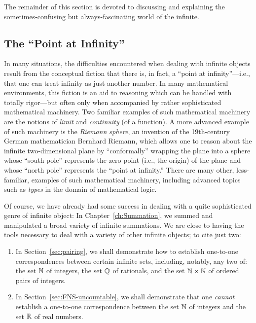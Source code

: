 \medskip

The remainder of this section is devoted to discussing and explaining the sometimes-confusing but always-fascinating world of the infinite.

\subsection{The ``Point at Infinity''}
\label{sec:point-at-infinity}

   
In many situations, the difficulties encountered when dealing with infinite objects result from the conceptual fiction that there is, in fact, a ``point at infinity''---i.e., that one can treat infinity as just
another number.  In many mathematical environments, this fiction is an aid to reasoning which can be handled with totally rigor---but often only when accompanied by rather sophisticated mathematical machinery.  Two familiar examples of such mathematical machinery are the notions
of  {\it limit} and {\it continuity} (of a function).  A more advanced example of such machinery is the {\it Riemann sphere}, an invention of the 19th-century German mathematician Bernhard Riemann, which allows one to reason about the infinite two-dimensional plane by ``conformally'' wrapping the plane into a sphere whose ``south pole'' represents the zero-point (i.e., the origin) of the plane and whose ``north pole'' represents the ``point at infinity.''  There are many other, less-familiar, examples of such mathematical machinery, including advanced topics such as {\it types} in the domain of mathematical logic.

\medskip

Of course, we have already had some success in dealing with a quite sophisticated genre of infinite object:  In Chapter~\ref{ch:Summation}, we summed and manipulated a broad variety of infinite summations.  We are close to having the tools necessary to deal with a variety of other infinite objects; to cite just two:
\begin{enumerate}
\item
In Section~\ref{sec:pairing}, we shall demonstrate how to establish one-to-one correspondences between certain infinite sets, including, notably, any two of: the set $\mathbb{N}$ of integers, the set $\mathbb{Q}$ of rationals, and the set $\mathbb{N} \times \mathbb{N}$ of ordered pairs of integers.

\item
In Section~\ref{sec:FNS-uncountable}, we shall demonstrate that one {\em cannot} establish a one-to-one correspondence between the set $\mathbb{N}$ of integers and the set $\mathbb{R}$ of real numbers.
\end{enumerate}


